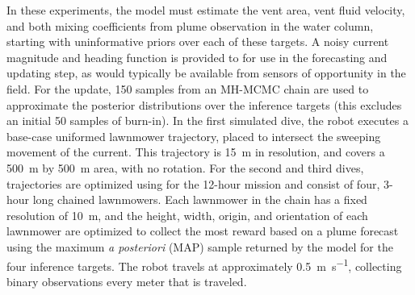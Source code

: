 In these experiments, the \PHUMES model must estimate the vent area, vent fluid velocity, and both mixing coefficients from plume observation in the water column, starting with uninformative priors over each of these targets. A noisy current magnitude and heading function is provided to \PHUMES for use in the forecasting and updating step, as would typically be available from sensors of opportunity in the field. For the \PHUMES update, 150 samples from an MH-MCMC chain are used to approximate the posterior distributions over the inference targets (this excludes an initial 50 samples of burn-in). In the first simulated dive, the robot executes a base-case uniformed lawnmower trajectory, placed to intersect the sweeping movement of the current. This trajectory is \SI{15}{\meter} in resolution, and covers a \SI{500}{\meter} by \SI{500}{\meter} area, with no rotation. For the second and third dives, trajectories are optimized using \PHORTEX for the 12-hour mission and consist of four, 3-hour long chained lawnmowers. Each lawnmower in the chain has a fixed resolution of \SI{10}{\meter}, and the height, width, origin, and orientation of each lawnmower are optimized to collect the most reward based on a plume forecast using the maximum \emph{a posteriori} (MAP) sample returned by the \PHUMES model for the four inference targets. The robot travels at approximately \SI{0.5}{\meter\per\second}, collecting binary observations every meter that is traveled. 

